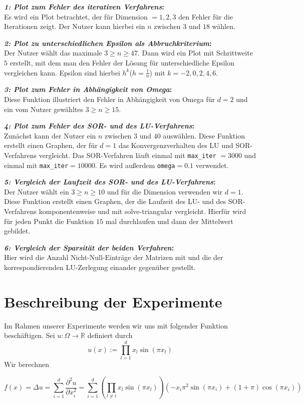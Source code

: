 \documentclass[smallheadings]{scrartcl}
\theoremstyle{definition}
\newcommand{\bfpara}[1]{
	
	\noindent \textbf{#1:}\,}
\begin{document}
 \bfpara{\textit{1: Plot zum Fehler des iterativen Verfahrens}}\\
 Es wird ein Plot betrachtet, der für Dimension $=1,2,3$ den Fehler für die Iterationen zeigt. Der Nutzer
 kann hierbei ein $n$ zwischen $3$ und $18$ wählen.
 \bfpara{\textit{2: Plot zu unterschiedlichen Epsilon als Abbruchkriterium}}\\
 Der Nutzer wählt das maximale $3\geq n\geq 47$. Dann wird ein Plot mit Schrittweite $5$
 erstellt, mit dem man den Fehler der Lösung für unterschiedliche Epsilon vergleichen kann.
 Epsilon sind hierbei $h^k$($h=\frac{1}{n}$) mit $k=-2,0,2,4,6$.
 \bfpara{\textit{3: Plot zum Fehler in Abhängigkeit von Omega}}\\
 Diese Funktion illustriert den Fehler in Abhängigkeit von Omega für $d=2$ und ein vom Nutzer gewähltes
 $3\geq n\geq 15$.
 \bfpara{\textit{4: Plot zum Fehler des SOR- und des LU-Verfahrens}}\\
 Zunächst kann der Nutzer ein $n$ zwischen $3$ und $40$ auswählen.
 Diese Funktion erstellt einen Graphen, der für $d=1$ das Konvergenzverhalten
 des LU und SOR-Verfahrens vergleicht. Das SOR-Verfahren läuft
 einmal mit \texttt{max\_iter} $=3000$ und einmal mit \texttt{max\_iter}$=10000$. Es wird außerdem \texttt{omega}$=0.1$ verwendet.
 \bfpara{\textit{5: Vergleich der Laufzeit des SOR- und des LU-Verfahrens}}\\
     Der Nutzer wählt ein $3\geq n\geq 10$ und für die Dimension verwenden wir $d=1$.
     Diese Funktion erstellt einen Graphen, der die Laufzeit des
     LU- und des SOR-Verfahrens komponentenweise und mit
     solve-triangular vergleicht. Hierfür wird für jeden Punkt die Funktion $15$ mal durchlaufen und dann der Mittelwert gebildet.
 \bfpara{\textit{6: Vergleich der Sparsität der beiden Verfahren}}\\
 Hier wird die Anzahl Nicht-Null-Einträge der Matrizen mit und die der korrespondierenden LU-Zerlegung einander gegenüber gestellt.

\section{Beschreibung der Experimente}

 \cbstart Im Rahmen unserer Experimente werden wir uns mit folgender Funktion beschäftigen.
Sei $u:\Omega\rightarrow \mathbb{R}$ definiert durch
$$u(x):=\prod_{l=1}^dx_l\sin (\pi x_l)$$
Wir berechnen

$$f(x)=\Delta u= \sum_{i=1}^d\frac{\partial ^2 u}{\partial x_i^2}=
 \sum_{i=1}^d \left(\prod_{l\neq i}x_l\sin (\pi x_l)\right)\left(-x_i\pi ^2\sin (\pi x_i)+(1+\pi)\cos (\pi x_i) \right)$$
\end{document}
